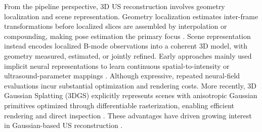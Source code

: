From the pipeline perspective, 3D US reconstruction involves geometry
localization and scene representation.
Geometry localization estimates inter-frame transformations before localized
slices are assembled by interpolation or compounding, making pose estimation
the primary focus
\cite{prevostDeepLearningSensorless2017,guoSensorlessFreehand3D2020,
guoUltrasoundVolumeReconstruction2023,luoRecONOnlineLearning2023,li2024f}.
Scene representation instead encodes localized B-mode observations into a
coherent 3D model, with geometry measured, estimated, or jointly refined.
Early approaches mainly used implicit neural representations to learn continuous
spatial-to-intensity or ultrasound-parameter mappings
\cite{yeungSensorlessVolumetricReconstruction2024,
wysockiUltraNeRFNeuralRadiance2024,
dagliNeRFUSRemovingUltrasound2024}.
Although expressive, repeated neural-field evaluations incur substantial
optimization and rendering costs.
More recently, 3D Gaussian Splatting (3DGS) explicitly represents scenes with
anisotropic Gaussian primitives optimized through differentiable rasterization,
enabling efficient rendering and direct inspection
\cite{kerbl3DGaussianSplatting2023}.
These advantages have driven growing interest in Gaussian-based US reconstruction
\cite{eidUltraGaussUltrafastGaussian2025,
yangUltraGSRealTimePhysicallyDecoupled2025,
duelmerUltraGRayPhysicsBasedGaussian2026}.

